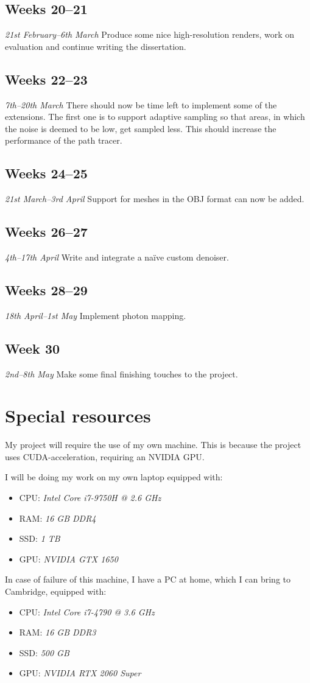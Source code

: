 \documentclass[12pt, a4paper]{article}
\newcommand{\newtime}[3]{
    \subsection*{#1}
    \vspace{-\baselineskip}
    \emph{#2}
    \vspace{\baselineskip}
    \newline
    #3
}
\begin{document}
    \newtime{Weeks 20--21}{21st February--6th March}{Produce some nice high-resolution renders, work on evaluation and continue writing the dissertation.}

    \newtime{Weeks 22--23}{7th--20th March}{There should now be time left to implement some of the extensions. The first one is to support adaptive sampling so that areas, in which the noise is deemed to be low, get sampled less. This should increase the performance of the path tracer.}
    
    \newtime{Weeks 24--25}{21st March--3rd April}{Support for meshes in the OBJ format can now be added.}

    \newtime{Weeks 26--27}{4th--17th April}{Write and integrate a naïve custom denoiser.}

    \newtime{Weeks 28--29}{18th April--1st May}{Implement photon mapping.}

    \newtime{Week 30}{2nd--8th May}{Make some final finishing touches to the project.}

    \section*{Special resources}
    My project will require the use of my own machine. This is because the project uses CUDA-acceleration, requiring an NVIDIA GPU.

    I will be doing my work on my own laptop equipped with:
    \begin{itemize}
        \setlength\itemsep{0.1em}
        \item CPU: \emph{Intel Core i7-9750H @ 2.6 GHz}
        \item RAM: \emph{16 GB DDR4}
        \item SSD: \emph{1 TB}
        \item GPU: \emph{NVIDIA GTX 1650}
    \end{itemize}
    
    In case of failure of this machine, I have a PC at home, which I can bring to Cambridge, equipped with:
    \begin{itemize}
        \setlength\itemsep{0.1em}
        \item CPU: \emph{Intel Core i7-4790 @ 3.6 GHz}
        \item RAM: \emph{16 GB DDR3}
        \item SSD: \emph{500 GB}
        \item GPU: \emph{NVIDIA RTX 2060 Super}
    \end{itemize}
\end{document}
